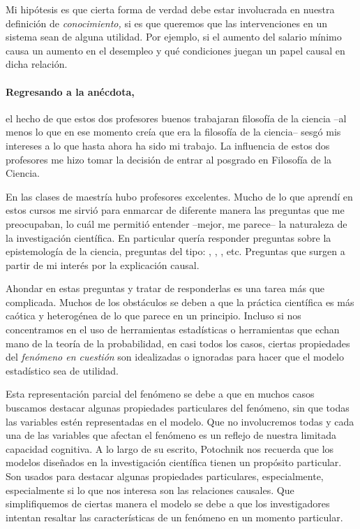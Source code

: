 Mi hipótesis es que cierta forma de verdad debe estar involucrada en
nuestra definición de \emph{conocimiento,} si es que queremos que las
intervenciones en un sistema sean de alguna utilidad. Por ejemplo, si
el aumento del salario mínimo causa un aumento en el desempleo y qué
condiciones juegan un papel causal en dicha relación.

\paragraph{Regresando a la anécdota,} el hecho de que estos dos profesores buenos trabajaran filosofía de
la ciencia --al menos lo que en ese momento creía que era la
filosofía de la ciencia-- sesgó mis intereses a lo que hasta ahora ha
sido mi trabajo. La influencia de estos dos profesores me hizo tomar
la decisión de entrar al posgrado en Filosofía de la Ciencia.

En las clases de maestría hubo profesores excelentes. Mucho de lo que
aprendí en estos cursos me sirvió para enmarcar de diferente manera
las preguntas que me preocupaban, lo cuál me permitió entender
--mejor, me parece-- la naturaleza de la investigación científica. En
particular quería responder preguntas sobre la epistemología de la
ciencia, preguntas del tipo: , , , etc. Preguntas que surgen a partir de mi interés
por la explicación causal.

Ahondar en estas preguntas y tratar de responderlas es una tarea más
que complicada. Muchos de los obstáculos se deben a que la práctica
científica es más caótica y heterogénea de lo que parece en un
principio. Incluso si nos concentramos en el uso de herramientas
estadísticas o herramientas que echan mano de la teoría de la
probabilidad, en casi todos los casos, ciertas propiedades del
\emph{fenómeno en cuestión} son idealizadas o ignoradas para hacer
que el modelo estadístico sea de utilidad.

Esta representación parcial del fenómeno se debe a que en muchos
casos buscamos destacar algunas propiedades particulares del
fenómeno, sin que todas las variables estén representadas en el
modelo. Que no involucremos todas y cada una de las variables que
afectan el fenómeno es un reflejo de nuestra limitada capacidad
cognitiva. A lo largo de su escrito, Potochnik nos recuerda que los
modelos diseñados en la investigación científica tienen un propósito
particular. Son usados para destacar algunas propiedades
particulares, especialmente, especialmente si lo que nos interesa son
las relaciones causales. Que simplifiquemos de ciertas manera el
modelo se debe a que los investigadores intentan resaltar las
características de un fenómeno en un momento particular.

